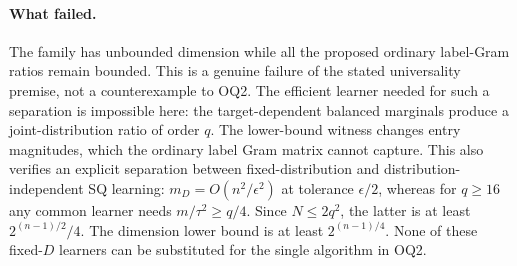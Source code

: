 \documentclass[11pt]{article}
\newcommand{\1}{\mathbf 1}
\begin{document}
\paragraph{What failed.}
The family has unbounded dimension while all the proposed ordinary label-Gram ratios remain bounded. This is a genuine failure of the stated universality premise, not a counterexample to OQ2. The efficient learner needed for such a separation is impossible here: the target-dependent balanced marginals produce a joint-distribution ratio of order $q$. The lower-bound witness changes entry magnitudes, which the ordinary label Gram matrix cannot capture. This also verifies an explicit separation between fixed-distribution and distribution-independent SQ learning: $m_D=O(n^2/\epsilon^2)$ at tolerance $\epsilon/2$, whereas for $q\geq16$ any common learner needs $m/\tau^2\geq q/4$. Since $N\leq2q^2$, the latter is at least $2^{(n-1)/2}/4$. The dimension lower bound is at least $2^{(n-1)/4}$. None of these fixed-$D$ learners can be substituted for the single algorithm in OQ2.
\end{document}
